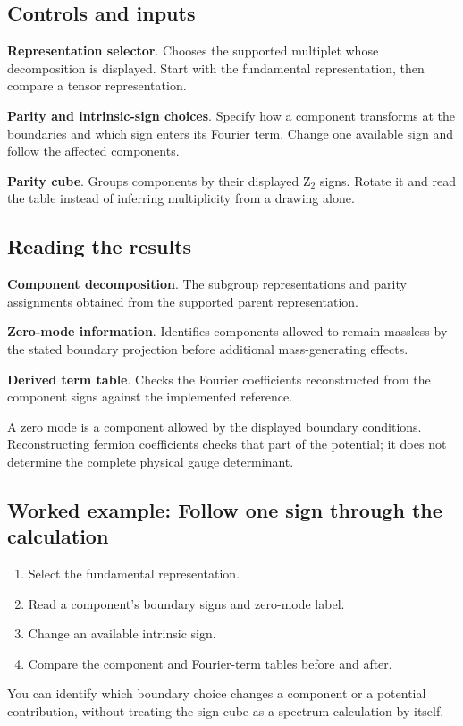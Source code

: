 \documentclass[11pt,a4paper]{article}
\begin{document}
\subsection*{Controls and inputs}
\textbf{Representation selector}. Chooses the supported multiplet whose decomposition is displayed. Start with the fundamental representation, then compare a tensor representation.

\textbf{Parity and intrinsic-sign choices}. Specify how a component transforms at the boundaries and which sign enters its Fourier term. Change one available sign and follow the affected components.

\textbf{Parity cube}. Groups components by their displayed Z\ensuremath{{}_{2}} signs. Rotate it and read the table instead of inferring multiplicity from a drawing alone.

\subsection*{Reading the results}
\textbf{Component decomposition}. The subgroup representations and parity assignments obtained from the supported parent representation.

\textbf{Zero-mode information}. Identifies components allowed to remain massless by the stated boundary projection before additional mass-generating effects.

\textbf{Derived term table}. Checks the Fourier coefficients reconstructed from the component signs against the implemented reference.

A zero mode is a component allowed by the displayed boundary conditions. Reconstructing fermion coefficients checks that part of the potential; it does not determine the complete physical gauge determinant.
\subsection*{Worked example: Follow one sign through the calculation}
\begin{enumerate}
\item Select the fundamental representation.
\item Read a component's boundary signs and zero-mode label.
\item Change an available intrinsic sign.
\item Compare the component and Fourier-term tables before and after.
\end{enumerate}
You can identify which boundary choice changes a component or a potential contribution, without treating the sign cube as a spectrum calculation by itself.
\end{document}

